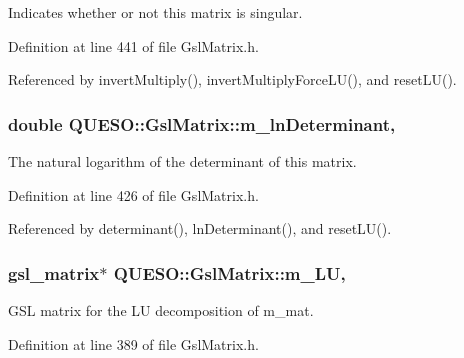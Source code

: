 Indicates whether or not {\ttfamily this} matrix is singular. 



Definition at line 441 of file Gsl\-Matrix.\-h.



Referenced by invert\-Multiply(), invert\-Multiply\-Force\-L\-U(), and reset\-L\-U().

\hypertarget{class_q_u_e_s_o_1_1_gsl_matrix_a22b386a1106b9a583edea11bccf15cb9}{
\subsubsection[{m\-\_\-ln\-Determinant}]{\setlength{\rightskip}{0pt plus 5cm}double Q\-U\-E\-S\-O\-::\-Gsl\-Matrix\-::m\-\_\-ln\-Determinant\hspace{0.3cm}{\ttfamily [mutable]}, {\ttfamily [private]}}}\label{class_q_u_e_s_o_1_1_gsl_matrix_a22b386a1106b9a583edea11bccf15cb9}


The natural logarithm of the determinant of {\ttfamily this} matrix. 



Definition at line 426 of file Gsl\-Matrix.\-h.



Referenced by determinant(), ln\-Determinant(), and reset\-L\-U().

\hypertarget{class_q_u_e_s_o_1_1_gsl_matrix_ada9c659bda4c71273af34e79eba4ec81}{
\subsubsection[{m\-\_\-\-L\-U}]{\setlength{\rightskip}{0pt plus 5cm}gsl\-\_\-matrix$\ast$ Q\-U\-E\-S\-O\-::\-Gsl\-Matrix\-::m\-\_\-\-L\-U\hspace{0.3cm}{\ttfamily [mutable]}, {\ttfamily [private]}}}\label{class_q_u_e_s_o_1_1_gsl_matrix_ada9c659bda4c71273af34e79eba4ec81}


G\-S\-L matrix for the L\-U decomposition of m\-\_\-mat. 



Definition at line 389 of file Gsl\-Matrix.\-h.



